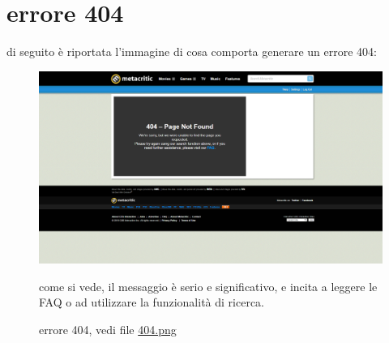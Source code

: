 \documentclass[12pt]{article}
\begin{document}
\section{errore 404}
di seguito è riportata l'immagine di cosa comporta generare un errore 404:\\
\begin{figure}[H]
	\begin{center}
		\includegraphics[width=13.5cm]{404.png}
		\caption{errore 404, vedi file \href{404.png}{404.png}}
	\end{center}
	come si vede, il messaggio è serio e significativo, e incita a leggere le FAQ o ad utilizzare la funzionalità di ricerca.
\end{figure}
\newpage
\end{document}
